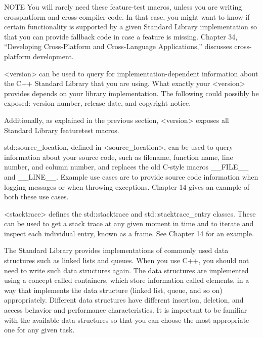 \begin{myNotic}{NOTE}
You will rarely need these feature-test macros, unless you are writing crossplatform and cross-compiler code. In that case, you might want to know if certain functionality is supported by a given Standard Library implementation so that you can provide fallback code in case a feature is missing. Chapter 34, “Developing Cross-Platform and Cross-Language Applications,” discusses cross-platform development.
\end{myNotic}


<version> can be used to query for implementation-dependent information about the C++ Standard Library that you are using. What exactly your <version> provides depends on your library implementation. The following could possibly be exposed: version number, release date, and copyright notice.

Additionally, as explained in the previous section, <version> exposes all Standard Library featuretest macros.


std::source\_location, defined in <source\_location>, can be used to query information about your source code, such as filename, function name, line number, and column number, and replaces the old C-style macros \_\_FILE\_\_ and \_\_LINE\_\_. Example use cases are to provide source code information when logging messages or when throwing exceptions. Chapter 14 gives an example of both these use cases.




<stacktrace> defines the std::stacktrace and std::stacktrace\_entry classes. These can be used to get a stack trace at any given moment in time and to iterate and inspect each individual entry, known as a frame. See Chapter 14 for an example.


The Standard Library provides implementations of commonly used data structures such as linked lists and queues. When you use C++, you should not need to write such data structures again. The data structures are implemented using a concept called containers, which store information called elements, in a way that implements the data structure (linked list, queue, and so on) appropriately. Different data structures have different insertion, deletion, and access behavior and performance characteristics. It is important to be familiar with the available data structures so that you can choose the most appropriate one for any given task.

